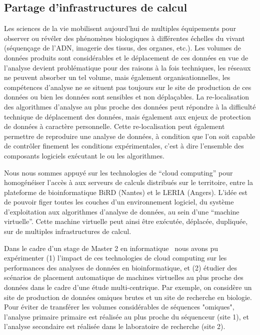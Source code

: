 \documentclass[a4paper,11pt]{article}
\theoremstyle{definition}
\begin{document}
\subsection{Partage d'infrastructures de calcul}
Les sciences de la vie mobilisent aujourd'hui de multiples équipements pour observer ou révéler des phénomènes biologiques à différentes échelles du vivant (séquençage de l'ADN, imagerie des tissus, des organes, etc.). Les volumes de données produits sont considérables et le déplacement de ces données en vue de l'analyse devient problématique pour des raisons à la fois techniques, les réseaux ne peuvent absorber un tel volume, mais également organisationnelles, les compétences d'analyse ne se situent pas toujours sur le site de production de ces données ou bien les données sont sensibles et non déplaçables. La re-localisation des algorithmes d'analyse au plus proche des données peut répondre à la difficulté technique de déplacement des données, mais également aux enjeux de protection de données à caractère personnelle. Cette re-localisation peut également permettre de reproduire une analyse de données, à condition que l'on soit capable de contrôler finement les conditions expérimentales, c'est à dire l'ensemble des composants logiciels exécutant le ou les algorithmes. 

Nous nous sommes appuyé sur les technologies de ``cloud computing'' pour homogénéiser l'accès à aux serveurs de calculs distribués sur le territoire, entre la plateforme de bioinformatique BiRD (Nantes) et le LERIA (Angers). L'idée est de pouvoir figer toutes les couches d'un environnement logiciel, du système d'exploitation aux algorithmes d'analyse de données, au sein d'une ``machine virtuelle''. Cette machine virtuelle peut ainsi être exécutée, déplacée, dupliquée, sur de multiples infrastructures de calcul. 

Dans le cadre d'un stage de Master 2 en informatique~\cite{refPatient} nous avons pu expérimenter (1) l'impact de ces technologies de cloud computing sur les performances des analyses de données en bioinformatique, et (2) étudier des scénarios de placement automatique de machines virtuelles au plus proche des données dans le cadre d'une étude multi-centrique. Par exemple, on considère un site de production de données omiques brutes et un site de recherche en biologie. Pour éviter de transférer les volumes considérables de séquences "omiques", l'analyse primaire primaire est réalisée au plus proche du séquenceur (site 1), et l'analyse secondaire est réalisée dans le laboratoire de recherche (site 2).
\end{document}
